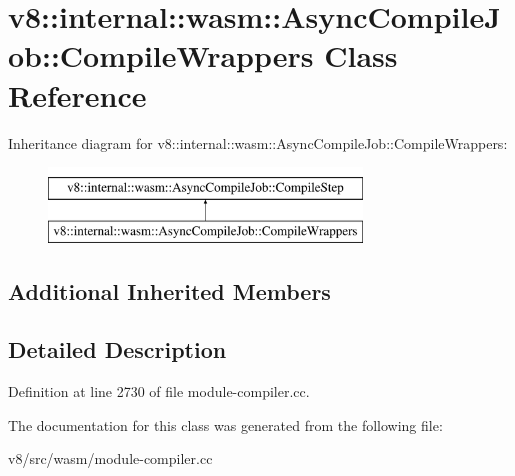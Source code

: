 \hypertarget{classv8_1_1internal_1_1wasm_1_1AsyncCompileJob_1_1CompileWrappers}{}\section{v8\+:\+:internal\+:\+:wasm\+:\+:Async\+Compile\+Job\+:\+:Compile\+Wrappers Class Reference}
\label{classv8_1_1internal_1_1wasm_1_1AsyncCompileJob_1_1CompileWrappers}
Inheritance diagram for v8\+:\+:internal\+:\+:wasm\+:\+:Async\+Compile\+Job\+:\+:Compile\+Wrappers\+:\begin{figure}[H]
\begin{center}
\leavevmode
\includegraphics[height=2.000000cm]{classv8_1_1internal_1_1wasm_1_1AsyncCompileJob_1_1CompileWrappers}
\end{center}
\end{figure}
\subsection*{Additional Inherited Members}


\subsection{Detailed Description}


Definition at line 2730 of file module-\/compiler.\+cc.



The documentation for this class was generated from the following file\+:\begin{DoxyCompactItemize}
\item 
v8/src/wasm/module-\/compiler.\+cc\end{DoxyCompactItemize}
